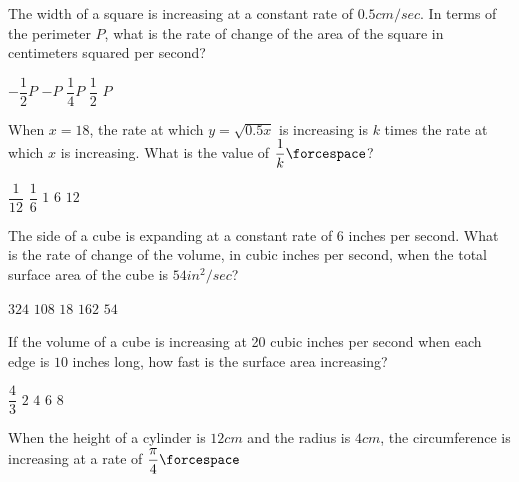 \begin{questions}
    \question The width of a square is increasing at a constant rate of $0.5 \si{cm \per sec}$. In terms of the perimeter $P$, what is the rate of change of the area of the square in centimeters squared per second? \\

    \begin{oneparchoices}
        \choice $-\dfrac{1}{2}P$
        \choice $-P$
        \choice $\dfrac{1}{4}P$
        \choice $\dfrac{1}{2}$
        \choice $P$
    \end{oneparchoices} \par \horizontalline

    \question When $x = 18$, the rate at which $y = \sqrt{0.5x}$ is increasing is $k$ times the rate at which $x$ is increasing. What is the value of $\dfrac{1}{k} \forcespace$? \\

    \begin{oneparchoices}
        \choice $\dfrac{1}{12}$
        \choice $\dfrac{1}{6}$
        \choice $1$
        \choice $6$
        \choice $12$
    \end{oneparchoices} \par \horizontalline

    \question The side of a cube is expanding at a constant rate of $6$ inches per second. What is the rate of change of the volume, in cubic inches per second, when the total surface area of the cube is $54 \si{in^2 \per sec}$? \\

    \begin{oneparchoices}
        \choice $324$
        \choice $108$
        \choice $18$
        \choice $162$
        \choice $54$
    \end{oneparchoices} \par \horizontalline

    \question If the volume of a cube is increasing at 20 cubic inches per second when each edge is $10$ inches long, how fast is the surface area increasing? \\

    \begin{oneparchoices}
        \choice $\dfrac{4}{3}$
        \choice $2$
        \choice $4$
        \choice $6$
        \choice $8$
    \end{oneparchoices} \par \horizontalline

    \question When the height of a cylinder is $12 \si{cm}$ and the radius is $4 \si{cm}$, the circumference is increasing at a rate of $\dfrac{\pi}{4} \forcespace$ \\


\end{questions}
